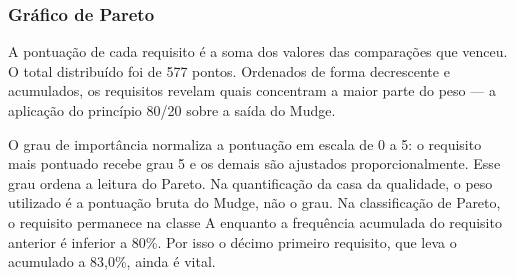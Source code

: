\subsubsection{Gráfico de Pareto}

A pontuação de cada requisito é a soma dos valores das comparações que venceu. O total distribuído foi de 577 pontos. Ordenados de forma decrescente e acumulados, os requisitos revelam quais concentram a maior parte do peso --- a aplicação do princípio 80/20 sobre a saída do Mudge.

O grau de importância normaliza a pontuação em escala de 0 a 5: o requisito mais pontuado recebe grau 5 e os demais são ajustados proporcionalmente. Esse grau ordena a leitura do Pareto. Na quantificação da casa da qualidade, o peso utilizado é a pontuação bruta do Mudge, não o grau. Na classificação de Pareto, o requisito permanece na classe A enquanto a frequência acumulada do requisito anterior é inferior a 80\%. Por isso o décimo primeiro requisito, que leva o acumulado a 83,0\%, ainda é vital.



